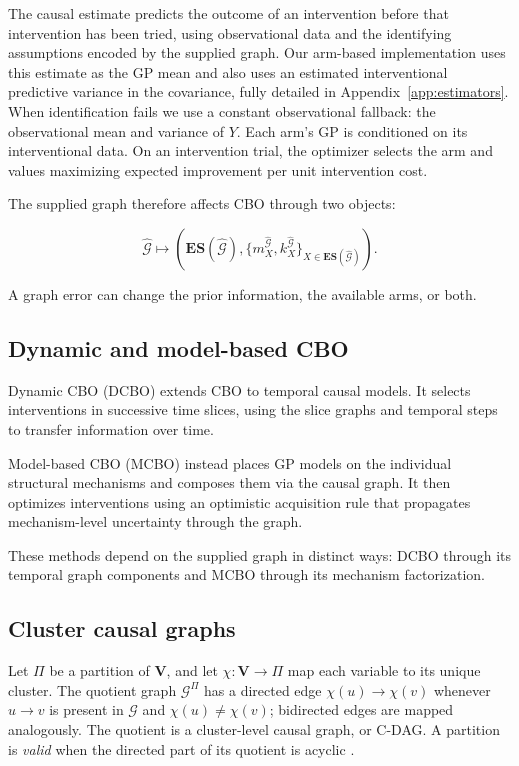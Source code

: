 \documentclass[twoside]{article}
\newcommand{\Gg}{\mathcal{G}}
\newcommand{\ES}{\mathbf{ES}}
\begin{document}
The causal estimate predicts the outcome of an intervention before that intervention has been tried, using observational data and the identifying assumptions encoded by the supplied graph. Our arm-based implementation uses this estimate as the GP mean and also uses an estimated interventional predictive variance in the covariance, fully detailed in Appendix~\ref{app:estimators}. When identification fails we use a constant observational fallback: the observational mean and variance of \(Y\). Each arm's GP is conditioned on its interventional data. On an intervention trial, the optimizer selects the arm and values maximizing expected improvement per unit intervention cost.


The supplied graph therefore affects CBO through two objects:

\[
\widehat{\Gg}\longmapsto
 \left(\ES(\widehat{\Gg}),
 \{m_X^{\widehat{\Gg}},k_X^{\widehat{\Gg}}\}_{X\in\ES(\widehat{\Gg})}\right).
\]

A graph error can change the prior information, the available arms, or both.

\subsection{Dynamic and model-based CBO}

Dynamic CBO (DCBO) \citep{agliettiDynamicCausalBayesian2021a} extends CBO to temporal causal models. It selects interventions in successive time slices, using the slice graphs and temporal steps to transfer information over time.

Model-based CBO (MCBO) \citep{sussexMODELBASEDCAUSALBAYESIAN2023} instead places GP models on the individual structural mechanisms and composes them via the causal graph. It then optimizes interventions using an optimistic acquisition rule that propagates mechanism-level uncertainty through the graph. 

These methods depend on the supplied graph in distinct ways: DCBO through its temporal graph components and MCBO through its mechanism factorization.

\subsection{Cluster causal graphs}
Let \(\Pi\) be a partition of \(\mathbf V\), and let \(\chi:\mathbf V\to\Pi\) map each variable to its unique cluster. The quotient graph \(\Gg^\Pi\) has a directed edge \(\chi(u)\to\chi(v)\) whenever \(u\to v\) is present in \(\Gg\) and \(\chi(u)\ne\chi(v)\); bidirected edges are mapped analogously. The quotient is a cluster-level causal graph, or C-DAG. A partition is \emph{valid} when the directed part of its quotient is acyclic \citep{madaleno2026a, madalenoCoarseningLinearNonGaussian2026}.
\end{document}
